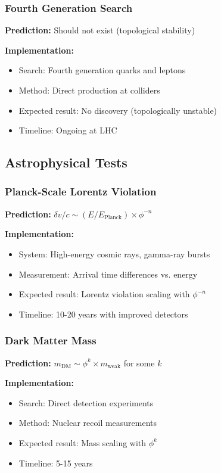 \documentclass[11pt]{article}
\theoremstyle{definition}
\newcommand{\goldenratio}{\phi}
\begin{document}
\subsubsection{Fourth Generation Search}

\textbf{Prediction:} Should not exist (topological stability)

\textbf{Implementation:}
\begin{itemize}
\item Search: Fourth generation quarks and leptons
\item Method: Direct production at colliders
\item Expected result: No discovery (topologically unstable)
\item Timeline: Ongoing at LHC
\end{itemize}

\subsection{Astrophysical Tests}

\subsubsection{Planck-Scale Lorentz Violation}

\textbf{Prediction:} $\delta v/c \sim (E/E_{\text{Planck}}) \times \goldenratio^{-n}$

\textbf{Implementation:}
\begin{itemize}
\item System: High-energy cosmic rays, gamma-ray bursts
\item Measurement: Arrival time differences vs. energy
\item Expected result: Lorentz violation scaling with $\goldenratio^{-n}$
\item Timeline: 10-20 years with improved detectors
\end{itemize}

\subsubsection{Dark Matter Mass}

\textbf{Prediction:} $m_{\text{DM}} \sim \goldenratio^k \times m_{\text{weak}}$ for some $k$

\textbf{Implementation:}
\begin{itemize}
\item Search: Direct detection experiments
\item Method: Nuclear recoil measurements
\item Expected result: Mass scaling with $\goldenratio^k$
\item Timeline: 5-15 years
\end{itemize}
\end{document}

